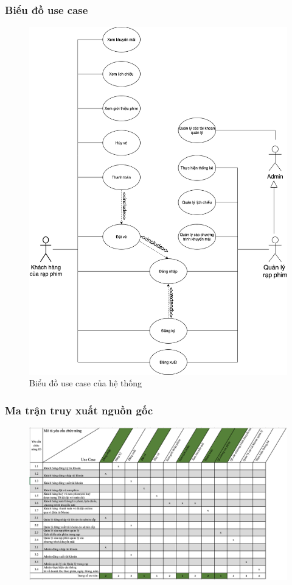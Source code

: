 \documentclass[a4paper, 12pt]{article}
\begin{document}
    \subsubsection{Biểu đồ use case}
    \begin{figure}[H]
        \includegraphics[scale = 0.5]{./UsecaseDiagram/usecase.png}
        \caption{Biểu đồ use case của hệ thống}
    \end{figure}

    \subsubsection{Ma trận truy xuất nguồn gốc}
    \begin{figure}[H]
        \includegraphics[scale = 0.7]{TraceMatrix/traceMatrix.png}
    \end{figure}
\end{document}
